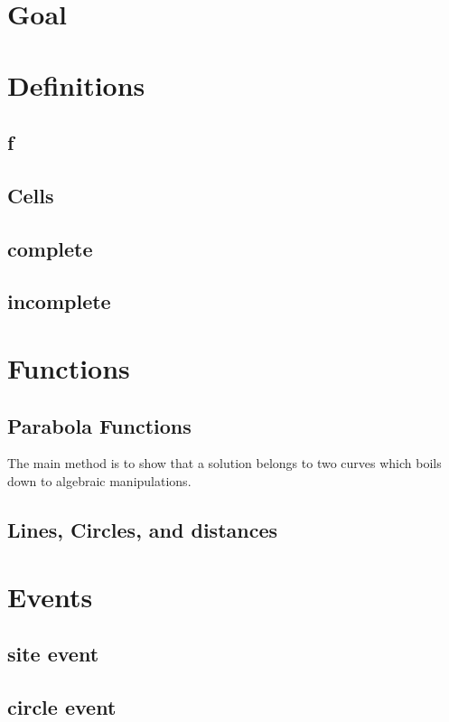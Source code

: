 \documentclass{article}
\begin{document}
\section{Goal}
\section{Definitions}
\subsection{f}
\subsection{Cells}
\subsection{complete}
\subsection{incomplete}

\section{Functions}
\subsection{Parabola Functions}
The main method is to show that a solution belongs to two curves which boils down to algebraic manipulations.

\subsection{Lines, Circles, and distances}
\section{Events}
\subsection{site event}
\subsection{circle event}
\end{document}
